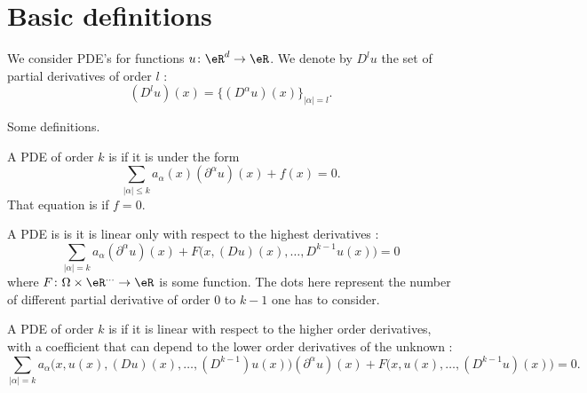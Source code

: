 
\section{Basic definitions}

We consider PDE's for functions \( u\colon \eR^d\to \eR\). We denote by \( D^lu\) the set of partial derivatives of order \( l\) :
\begin{equation}
    (D^lu)(x)=\{ (D^{\alpha}u)(x) \}_{| \alpha |=l}.
\end{equation}

Some definitions.
\begin{definition}
    A PDE of order \( k\) is  if it is under the form
    \begin{equation}
        \sum_{| \alpha |\leq k}a_{\alpha}(x)(\partial^{\alpha}u)(x)+f(x)=0.
    \end{equation}
    That equation is  if \( f=0\).
\end{definition}

\begin{definition}
    A PDE is  is it is linear only with respect to the highest derivatives :
    \begin{equation}
        \sum_{| \alpha |=k}a_{\alpha}(\partial^{\alpha}u)(x)+F\big( x, (Du)(x),\ldots, D^{k-1}u(x) \big)=0
    \end{equation}
    where \( F\colon \Omega\times \eR^{\ldots}\to \eR\) is some function. The dots here represent the number of different partial derivative of order \( 0\) to \( k-1\) one has to consider.
\end{definition}

\begin{definition}
    A PDE of order \( k\) is  if it is linear with respect to the higher order derivatives, with a coefficient that can depend to the lower order derivatives of the unknown :
    \begin{equation}
        \sum_{| \alpha |=k}a_{\alpha}\big( x,u(x),(Du)(x),\ldots, (D^{k-1})u(x) \big)(\partial^{\alpha}u)(x)+F\big( x,u(x),\ldots, (D^{k-1}u)(x) \big)=0.
    \end{equation}
\end{definition}

